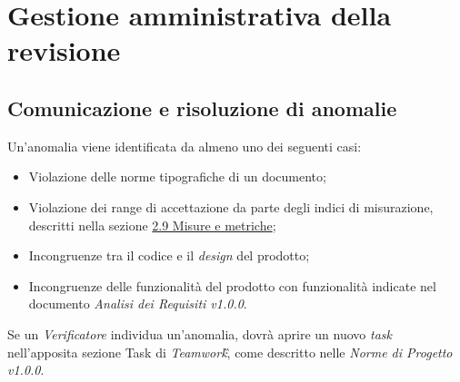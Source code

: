 \section{Gestione amministrativa della revisione}

\subsection{Comunicazione e risoluzione di anomalie}
\label{cap: sezione 3.1 Comunicazione e risoluzione di anomalie}

Un'anomalia viene identificata da almeno uno dei seguenti casi:

\begin{itemize}
	\item Violazione delle norme tipografiche di un documento;
	\item Violazione dei range di accettazione da parte degli indici di misurazione, descritti nella sezione \hyperref[cap:sezione 2.9 Misure e metriche]{2.9 Misure e metriche};
	\item Incongruenze tra il codice e il \textit{design} del prodotto;
	\item Incongruenze delle funzionalità del prodotto con funzionalità 
	indicate nel documento \textit{Analisi dei Requisiti v1.0.0}.
\end{itemize}
Se un \textit{Verificatore} individua un'anomalia, dovrà aprire un nuovo \textit{task} 
nell'apposita sezione Task di \textit{Teamwork}\G, come descritto nelle 
\textit{Norme di Progetto v1.0.0}.

\newpage